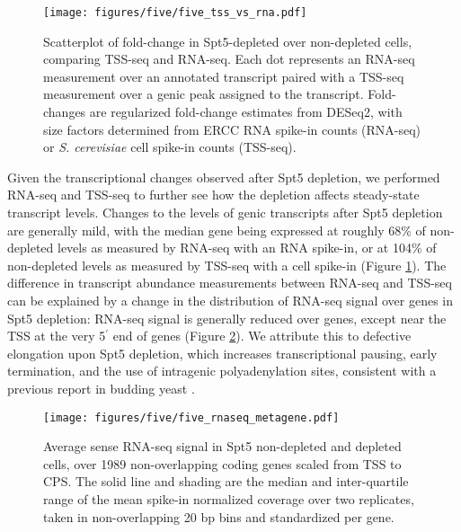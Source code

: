 \begin{figure}[h]
    \centering
    \texttt{[image: figures/five/five\_tss\_vs\_rna.pdf]}
    \caption[Scatterplot of fold-change in Spt5-depleted over non-depleted cells, comparing TSS-seq and RNA-seq.]{Scatterplot of fold-change in Spt5-depleted over non-depleted cells, comparing TSS-seq and RNA-seq. Each dot represents an RNA-seq measurement over an annotated transcript paired with a TSS-seq measurement over a genic peak assigned to the transcript. Fold-changes are regularized fold-change estimates from DESeq2, with size factors determined from ERCC RNA spike-in counts (RNA-seq) or \textit{S. cerevisiae} cell spike-in counts (TSS-seq).}
    \label{fig:five_tss_vs_rna}
\end{figure}
Given the transcriptional changes observed after Spt5 depletion, we performed RNA-seq and TSS-seq to further see how the depletion affects steady-state transcript levels.
Changes to the levels of genic transcripts after Spt5 depletion are generally mild, with the median gene being expressed at roughly 68\% of non-depleted levels as measured by RNA-seq with an RNA spike-in, or at 104\% of non-depleted levels as measured by TSS-seq with a cell spike-in (Figure \ref{fig:five_tss_vs_rna}).
The difference in transcript abundance measurements between RNA-seq and TSS-seq can be explained by a change in the distribution of RNA-seq signal over genes in Spt5 depletion: RNA-seq signal is generally reduced over genes, except near the TSS at the very 5$^\prime$ end of genes (Figure \ref{fig:five_rnaseq_metagene}).
We attribute this to defective elongation upon Spt5 depletion, which increases transcriptional pausing, early termination, and the use of intragenic polyadenylation sites, consistent with a previous report in budding yeast \citep{cui2003}.
\begin{figure}[h]
    \centering
    \texttt{[image: figures/five/five\_rnaseq\_metagene.pdf]}
    \caption[Average sense RNA-seq signal over non-overlapping coding genes, from Spt5 depleted and non-depleted cells.]{Average sense RNA-seq signal in Spt5 non-depleted and depleted cells, over 1989 non-overlapping coding genes scaled from TSS to CPS. The solid line and shading are the median and inter-quartile range of the mean spike-in normalized coverage over two replicates, taken in non-overlapping 20 bp bins and standardized per gene.}
    \label{fig:five_rnaseq_metagene}
\end{figure}

